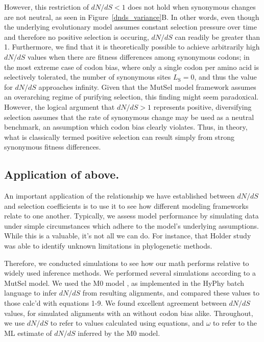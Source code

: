 \documentclass{pnastwo}
\begin{document}
\begin{article}
However, this restriction of $dN/dS < 1$ does not hold when synonymous changes are not neutral, as seen in Figure~\ref{dnds_variance}B. In other words, even though the underlying evolutionary model assumes constant selection pressure over time and therefore no positive selection is occuring, $dN/dS$ can readily be greater than 1. Furthermore, we find that it is theoretically possible to achieve arbitrarily high $dN/dS$ values when there are fitness differences among synonymous codons; in the most extreme case of codon bias, where only a single codon per amino acid is selectively tolerated, the number of synonymous sites $L_\text{S} = 0$, and thus the value for $dN/dS$ approaches infinity. Given that the MutSel model framework assumes an overarching regime of purifying selection, this finding might seem paradoxical. However, the logical argument that $dN/dS > 1$ represents positive, diversifying selection assumes that the rate of synonymous change may be used as a neutral benchmark, an assumption which codon bias clearly violates. Thus, in theory, what is classically termed positive selection can result simply from strong synonymous fitness differences. 	
		
		

\subsection*{Application of above.}

An important application of the relationship we have established between $dN/dS$ and selection coefficients is to use it to see how different modeling frameworks relate to one another. Typically, we assess model performance by simulating data under simple circumstances which adhere to the model's underlying assumptions. While this is a valuable, it's not all we can do. For instance, that Holder study was able to identify unknown limitations in phylogenetic methods. 

Therefore, we conducted simulations to see how our math performs relative to widely used inference methods.
We performed several simulations according to a MutSel model. We used the M0 model \cite{NielsenYang1998}, as implemented in the HyPhy batch language \cite{KosakovskyPondetal2005} to infer $dN/dS$ from resulting alignments, and compared these values to those calc'd with equations 1-9. We found excellent agreement between $dN/dS$ values, for simulated alignments with an without codon bias alike. Throughout, we use $dN/dS$ to refer to values calculated using equations, and $\omega$ to refer to the ML estimate of $dN/dS$ inferred by the M0 model.


\end{article}
\end{document}
